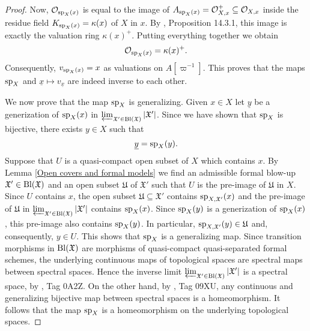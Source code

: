 \documentclass[12pt,twoside,a4paper]{article}
\theoremstyle{definition}
\theoremstyle{remark}
\newcommand\Bl{{\rm Bl}}
\newcommand\spc{{\rm sp}}
\begin{document}
\begin{proof}
Now, $\mathcal{O}_{\spc_{X}(x)}$ is equal to the image of $A_{\spc_{X}(x)}=\mathcal{O}_{X,x}^{+}\subseteq \mathcal{O}_{X,x}$ inside the residue field $K_{\spc_{X}(x)}=\kappa(x)$ of $X$ in $x$. By \cite{ConradNotes}, Proposition 14.3.1, this image is exactly the valuation ring $\kappa(x)^{+}$. Putting everything together we obtain \begin{equation*}\mathcal{O}_{\spc_{X}(x)}=\kappa(x)^{+}.\end{equation*}Consequently, $v_{\spc_{X}(x)}=x$ as valuations on $A[\varpi^{-1}]$. This proves that the maps $\spc_{X}$ and $\underline{x}\mapsto v_{\underline{x}}$ are indeed inverse to each other. 

We now prove that the map $\spc_{X}$ is generalizing. Given $x\in X$ let $\underline{y}$ be a generization of $\spc_{X}(x)$ in $\varprojlim_{\mathfrak{X}'\in\Bl(\mathfrak{X})}\vert\mathfrak{X}'\vert$. Since we have shown that $\spc_{X}$ is bijective, there exists $y\in X$ such that \begin{equation*}\underline{y}=\spc_{X}(y).\end{equation*}Suppose that $U$ is a quasi-compact open subset of $X$ which contains $x$. By Lemma \ref{Open covers and formal models} we find an admissible formal blow-up $\mathfrak{X}'\in \Bl(\mathfrak{X})$ and an open subset $\mathfrak{U}$ of $\mathfrak{X}'$ such that $U$ is the pre-image of $\mathfrak{U}$ in $X$. Since $U$ contains $x$, the open subset $\mathfrak{U}\subseteq \mathfrak{X}'$ contains $\spc_{X,\mathfrak{X}'}(x)$ and the pre-image of $\mathfrak{U}$ in $\varprojlim_{\mathfrak{X}'\in\Bl(\mathfrak{X})}\vert\mathfrak{X}'\vert$ contains $\spc_{X}(x)$. Since $\spc_{X}(y)$ is a generization of $\spc_{X}(x)$, this pre-image also contains $\spc_{X}(y)$. In particular, $\spc_{X,\mathfrak{X}'}(y)\in \mathfrak{U}$ and, consequently, $y\in U$. This shows that $\spc_{X}$ is a generalizing map. Since transition morphisms in $\Bl(\mathfrak{X})$ are morphisms of quasi-compact quasi-separated formal schemes, the underlying continuous maps of topological spaces are spectral maps between spectral spaces. Hence the inverse limit $\varprojlim_{\mathfrak{X}'\in\Bl(\mathfrak{X})}\vert\mathfrak{X}'\vert$ is a spectral space, by \cite{Stacks}, Tag 0A2Z. On the other hand, by \cite{Stacks}, Tag 09XU, any continuous and generalizing bijective map between spectral spaces is a homeomorphism. It follows that the map $\spc_{X}$ is a homeomorphism on the underlying topological spaces. 


\end{proof}
\end{document}
